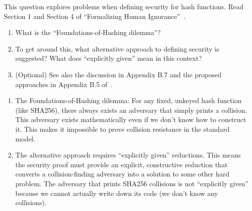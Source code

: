 \begin{exercise}[Optional]\label{ex:foundations-hashing}
  This question explores problems when defining security for hash functions.
  Read Section 1 and Section 4 of ``Formalizing Human Ignorance''~\cite{VIETCRYPT:Rogaway06}.
  \begin{enumerate}
    \item What is the ``Foundations-of-Hashing dilemma''?
    \item To get around this, what alternative approach to defining security is suggested?
    What does ``explicitly given'' mean in this context?
    \item (Optional) See also the discussion in Appendix B.7 and the proposed approaches in Appendix B.5 of~\cite{AC:BerLan13}.
  \end{enumerate}
\end{exercise}

\ifsolutions
\begin{mysolution}
  \begin{enumerate}
    \item The Foundations-of-Hashing dilemma: For any fixed, unkeyed hash function (like SHA256), there always exists an adversary that simply prints a collision.
    This adversary exists mathematically even if we don't know how to construct it.
    This makes it impossible to prove collision resistance in the standard model.
    \item The alternative approach requires ``explicitly given'' reductions.
    This means the security proof must provide an explicit, constructive reduction that converts a collision-finding adversary into a solution to some other hard problem.
    The adversary that prints SHA256 collisions is not ``explicitly given'' because we cannot actually write down its code (we don't know any collisions).
  \end{enumerate}
\end{mysolution}
\fi
